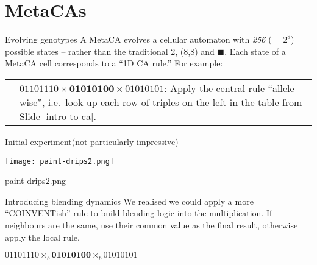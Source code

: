 \part{MetaCAs}
\frame{\partpage}

\begin{frame}{Evolving genotypes}{}
A {MetaCA } evolves a cellular automaton with \emph{{\color{red}2}{\color{LimeGreen}5}{\color{blue}6}} ($=2^8$) possible
states -- rather than the traditional 2, \framebox(8,8){} and $\blacksquare$.
Each state of a MetaCA cell corresponds to a ``1D CA rule.''  For example:\\[.3in]
\begin{tabular}{l@{\hskip -.1in}p{2.5in}}
\begin{fminipage}{1.7in}

\end{fminipage} & 
\vspace*{-.7in}
$01101110\times \mathbf{01010100}\times 01010101$: Apply the central rule ``allele-wise'', i.e.~look up each row of triples on the left in the table
from Slide \ref{intro-to-ca}. 
\end{tabular}
\end{frame}

\begin{frame}{Initial experiment}{(not particularly impressive)}
\begin{center}
\texttt{[image: paint-drips2.png]}

\pause
paint-drips2.png
\end{center}
\end{frame}

\begin{frame}{Introducing blending dynamics}{}
We realised we could apply a more ``COINVENTish'' rule to build
blending logic into the multiplication.  If neighbours are the
same, use their common value as the final result, otherwise apply
the local rule.
\begin{center}
\begin{fminipage}{3.6in}

\end{fminipage} 

$01101110\times_b \mathbf{01010100}\times_b 01010101$ 
\end{center}
\end{frame}

